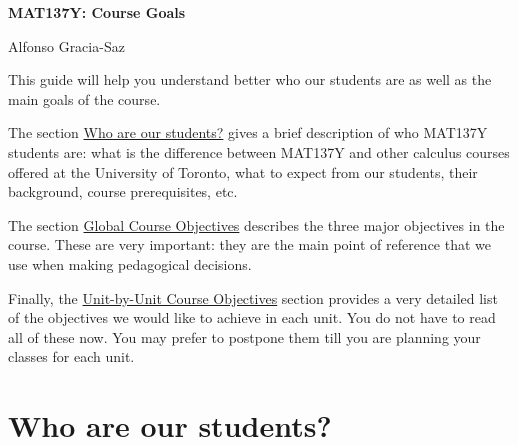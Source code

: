 \documentclass[11pt]{article}
\begin{document}
\thispagestyle{plain}
	\begin{center}
		{\bf {\LARGE 
		\textcolor{137cp3}{MAT137Y:  Course Goals}
		}
		
		\medskip
		{\Large
		\textcolor{137cp1}{Alfonso Gracia-Saz}
		}}
	\end{center}

{\baselineskip

This guide will help you understand better who our students are as well as the main goals of the course.

The section \hyperref[who]{Who are our students?} gives a brief description of who MAT137Y students are: what is the difference between MAT137Y and other calculus courses offered at the University of Toronto, what to expect from our students, their background, course prerequisites, etc.

The section \hyperref[GCO]{Global Course Objectives} describes the three major objectives in the course. These are very important: they are the main point of reference that we use when making pedagogical decisions. 

Finally, the \hyperref[Appendix]{Unit-by-Unit Course Objectives} section provides a very detailed list of the objectives we would like to achieve in each unit. You do not have to read all of these now. You may prefer to postpone them till you are planning your classes for each unit.


}

\tableofcontents

\newpage

\section{Who are our students?}\label{who}
\end{document}
